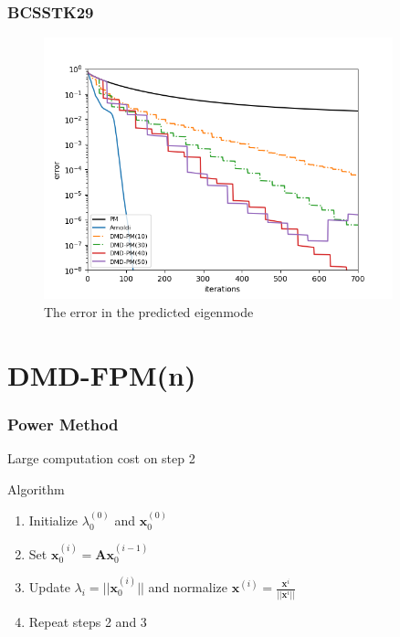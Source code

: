 \documentclass[fleqn]{beamer}
\begin{document}
\begin{frame}
\frametitle{BCSSTK29}
\begin{figure}
\centering
\includegraphics[width = 0.9\textwidth]{figures/boeing_error.png}
\caption{The error in the predicted eigenmode}
\end{figure}
\end{frame}

\section{DMD-FPM(n)}

\begin{frame}
\frametitle{Power Method}
Large computation cost on step 2
\begin{block}{Algorithm}
\begin{enumerate}
  \item Initialize $\lambda^{(0)}_0$ and $\mathbf{x}^{(0)}_0$ 
  \item Set $\mathbf{x}^{(i)}_0=\mathbf{A}\mathbf{x}^{(i-1)}_0$
  \item Update $\lambda_{i} = ||\mathbf{x}^{(i)}_0||$ and normalize $\mathbf{x}^{(i)} =\frac{\mathbf{x}^{i}}{||\mathbf{x}^{i}||}$
  \item Repeat steps 2 and 3 
\end{enumerate}
\end{block}
\end{frame}    
\end{document}
